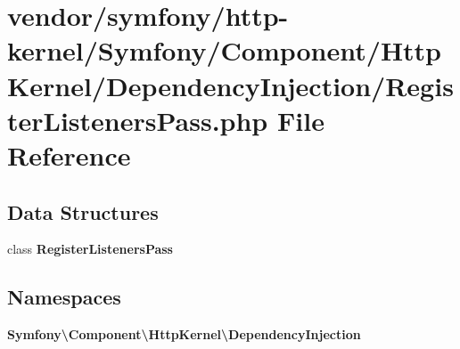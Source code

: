 \section{vendor/symfony/http-\/kernel/\+Symfony/\+Component/\+Http\+Kernel/\+Dependency\+Injection/\+Register\+Listeners\+Pass.php File Reference}
\label{http-kernel_2_symfony_2_component_2_http_kernel_2_dependency_injection_2_register_listeners_pass_8php}
\subsection*{Data Structures}
\begin{DoxyCompactItemize}
\item 
class {\bf Register\+Listeners\+Pass}
\end{DoxyCompactItemize}
\subsection*{Namespaces}
\begin{DoxyCompactItemize}
\item 
 {\bf Symfony\textbackslash{}\+Component\textbackslash{}\+Http\+Kernel\textbackslash{}\+Dependency\+Injection}
\end{DoxyCompactItemize}
